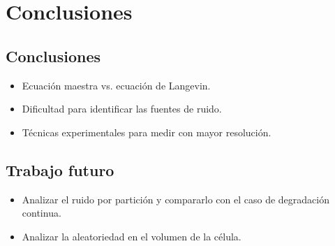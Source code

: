 \documentclass[xcolor=dvipsnames]{beamer}
\begin{document}

\section{Conclusiones}
\subsection{Conclusiones}
\begin{frame}
\begin{itemize}
\item Ecuaci\'on maestra vs. ecuaci\'on de Langevin.
\item Dificultad para identificar las fuentes de ruido.
\item T\'ecnicas experimentales para medir con mayor resoluci\'on.
\end{itemize}
\end{frame}
\subsection{Trabajo futuro}
\begin{frame}
\begin{itemize}

\item Analizar el ruido por partici\'on y compararlo con el caso de degradaci\'on continua.
\item Analizar la aleatoriedad en el volumen de la c\'elula.

\end{itemize}
\end{frame}

\begin{frame}[allowframebreaks]
\printbibliography
\end{frame}
\end{document}
